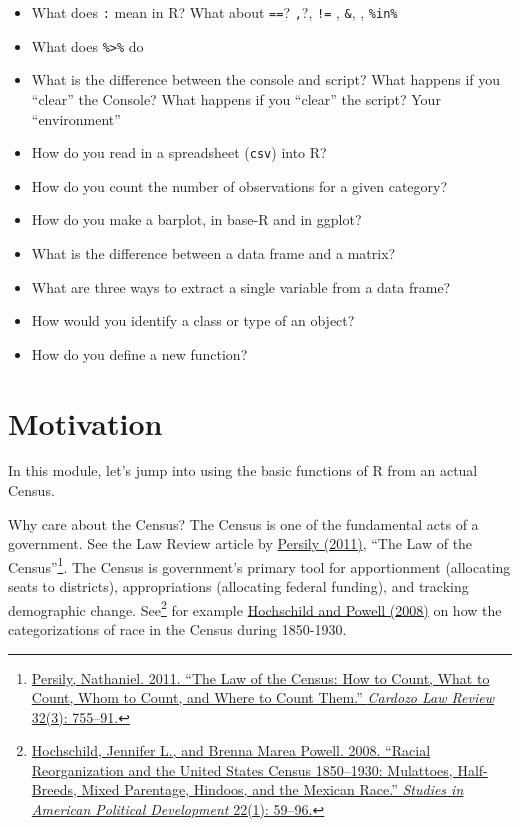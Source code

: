 \documentclass[]{book}
\providecommand{\tightlist}{%
  \setlength{\itemsep}{0pt}\setlength{\parskip}{0pt}}
\let\rmarkdownfootnote\footnote%
\def\footnote{\protect\rmarkdownfootnote}
\theoremstyle{definition}
\theoremstyle{definition}
\theoremstyle{definition}
\theoremstyle{remark}
\begin{document}
\begin{itemize}
\tightlist
\item
  What does \texttt{:} mean in R? What about \texttt{==}? \texttt{,}?,
  \texttt{!=} , \texttt{\&}, \texttt{\textbar{}}, \texttt{\%in\%}
\item
  What does \texttt{\%\textgreater{}\%} do
\item
  What is the difference between the console and script? What happens if
  you ``clear'' the Console? What happens if you ``clear'' the script?
  Your ``environment''
\item
  How do you read in a spreadsheet (\texttt{csv}) into R?
\item
  How do you count the number of observations for a given category?
\item
  How do you make a barplot, in base-R and in ggplot?
\item
  What is the difference between a data frame and a matrix?
\item
  What are three ways to extract a single variable from a data frame?
\item
  How would you identify a class or type of an object?
\item
  How do you define a new function?
\end{itemize}

\section{Motivation}\label{motivation}

In this module, let's jump into using the basic functions of R from an
actual Census.

Why care about the Census? The Census is one of the fundamental acts of
a government. See the Law Review article by
\href{http://cardozolawreview.com/Joomla1.5/content/32-3/Persily.32-3.pdf}{Persily
(2011)}, ``The Law of the Census''\footnote{\href{http://cardozolawreview.com/Joomla1.5/content/32-3/Persily.32-3.pdf}{Persily,
  Nathaniel. 2011. ``The Law of the Census: How to Count, What to Count,
  Whom to Count, and Where to Count Them.'' \emph{Cardozo Law Review}
  32(3): 755--91.}}. The Census is government's primary tool for
apportionment (allocating seats to districts), appropriations
(allocating federal funding), and tracking demographic change.
See\footnote{\href{https://dash.harvard.edu/bitstream/handle/1/3153295/hoschschild_racialreorganization.pdf?sequence=2}{Hochschild,
  Jennifer L., and Brenna Marea Powell. 2008. ``Racial Reorganization
  and the United States Census 1850--1930: Mulattoes, Half-Breeds, Mixed
  Parentage, Hindoos, and the Mexican Race.'' \emph{Studies in American
  Political Development} 22(1): 59--96.}} for example
\href{https://dash.harvard.edu/bitstream/handle/1/3153295/hoschschild_racialreorganization.pdf?sequence=2}{Hochschild
and Powell (2008)} on how the categorizations of race in the Census
during 1850-1930.
\end{document}
